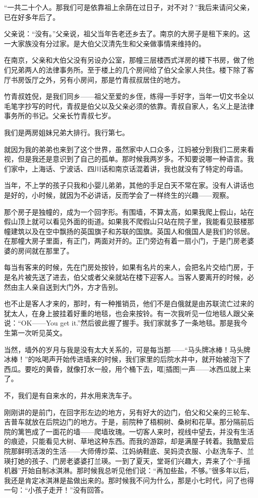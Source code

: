 \par “一共二十个人。那我们可是依靠祖上余荫在过日子，对不对？”我后来请问父亲，已在好多年后了。
\par 父亲说：“没有。”父亲说，祖父当年告老还乡去了。南京的大房子是租下来的。这一大家族没有分过家。是大伯父汉清先生和父亲做事情来维持的。
\par 在南京，父亲和大伯父没有另设办公室，那幢三层楼西式洋房的楼下书房，做了他们兄弟两人的法律事务所。至于楼上的几个房间给了伯父全家人共住。楼下除了客厅书房饭厅之外，另有小房间，那是竹青叔叔居住的地方。
\par 竹青叔姓倪，是我们同乡——祖父至爱的乡侄，练得一手好字，当年一切文书全以毛笔字抄写的时代，青叔是伯父以及父亲必须的依靠。青叔自家人，名义上是法律事务所的书记。父亲长竹青叔七岁。
\par 我们是两房姐妹兄弟大排行。我行第七。
\par 就因为我的弟弟也来到了这个世界，虽然家中人口众多，江妈被分到我们二房来看视，但是我还是意识到了自己的孤单。那时候我两岁多。不知要说哪一种语言。我们家中，上海话、宁波话、四川话和南京话混着讲，我也就没有了特定的母语。
\par 当年，不上学的孩子只我和小婴儿弟弟，其他的手足白天不常在家。没有人讲话也是好的，小时候，就因为不必讲话，反而学会了一样终生的兴趣——观察。
\par 那个房子是独幢的，成为一个回字形。有围墙，不算太高，如果我爬上假山，站在假山顶上就可以看见外面的街道。如果我不爬假山只站在院子里，我能看见鼓楼那幢建筑以及在空中飘扬的英国旗子和苏联的国旗。英国人和俄国人是我们的邻居。在那幢大房子里面，有正门，两面对开的。正门旁边有着一扇小门，于是门房老婆婆的房间就在那里了。
\par 每当有客来的时候，先在门房处按铃，如果有名片的来人，会把名片交给门房，于是名片被先送了进去，伯父或者父亲就站在楼下迎客人。当客人要离开的时候，必然由主人亲自送到大门外，方才告别。
\par 也不止是客人才来的，那时，有一种推销员，他们不是白俄就是由苏联流亡过来的犹太人，在身上披挂着好重的地毯，也会来按铃。有一次我听见一位地毯人跟父亲说：“OK——You get it.”然后彼此握了握手。我们家就多了一条地毯。那是我今生第一次听见英文。
\par 当然，墙外的岁月与我是没有太大关系的，可是每当那——“马头牌冰棒！马头牌冰棒！”的吆喝声开始传进墙来的时候，我们家里的后院水井中，就开始被泡下了西瓜。要吃的黄昏，就像打水一般，用个桶下去，哐[插图]一声——冰西瓜就上来了。
\par 不，我们是有自来水的，井水用来洗车子。
\par 刚刚讲的是前门，在回字形左边的地方，另有好大的边门，伯父和父亲的三轮车、吉普车就放在后院边门的地方。于是，前院种了梧桐树、桑树和花草。那分隔前后院的篱笆成了一面花的墙——爬墙玫瑰。一切客人来时，视线中望去，并没有生活的痕迹，只能看见大树、草地这种东西。而我的游踪，却是满屋子转着。我酷爱后院那鲜明活泼的生活——大师傅炒菜、江妈纳鞋底、吴妈烫衣服、小赵洗车子、兰瑛打她的孩子、门房老婆婆打兰瑛。一到了夏天，堂哥们兴趣大，弄来了个“手摇机器”开始自制冰淇淋。那时候我总听见他们说：“再加些盐，不够。”很多年以后，我还是肯定冰淇淋是盐做出来的。那时候我不问为什么，那是小七时代，问了也得一句：“小孩子走开！”没有回答。
